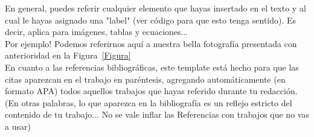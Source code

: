 En general, puedes referir cualquier elemento que hayas insertado en el texto y al cual le hayas asignado una "label" (ver código para que esto tenga sentido). Es decir, aplica para imágenes, tablas y ecuaciones...\\

Por ejemplo! Podemos referirnos aquí a nuestra bella fotografía presentada con anterioridad en la Figura~\ref{Figura}\\

En cuanto a las referencias bibliográficas, este template está hecho para que las citas aparezcan en el trabajo en paréntesis, agregando automáticamente (en formato APA) todos aquellos trabajos que hayas referido durante tu redacción. (En otras palabras, lo que aparezca en la bibliografía es un reflejo estricto del contenido de tu trabajo... No se vale inflar las Referencias con trabajos que no vas a usar) \parencite{Articulo, Libro, Capitulo}\\
